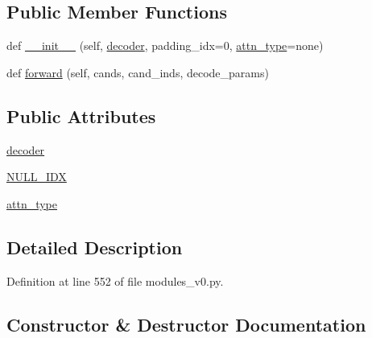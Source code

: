 \subsection*{Public Member Functions}
\begin{DoxyCompactItemize}
\item 
def \hyperlink{classparlai_1_1agents_1_1legacy__agents_1_1seq2seq_1_1modules__v0_1_1Ranker_a79693c86fc7bebea2b197e1c168ec002}{\+\_\+\+\_\+init\+\_\+\+\_\+} (self, \hyperlink{classparlai_1_1agents_1_1legacy__agents_1_1seq2seq_1_1modules__v0_1_1Ranker_a5500f3bd094b3a3b19c992cbc1d42918}{decoder}, padding\+\_\+idx=0, \hyperlink{classparlai_1_1agents_1_1legacy__agents_1_1seq2seq_1_1modules__v0_1_1Ranker_a17f285352bdb89eea215c874a38bee02}{attn\+\_\+type}=\textquotesingle{}none\textquotesingle{})
\item 
def \hyperlink{classparlai_1_1agents_1_1legacy__agents_1_1seq2seq_1_1modules__v0_1_1Ranker_a48177b131d765ebd734d25f962c44f55}{forward} (self, cands, cand\+\_\+inds, decode\+\_\+params)
\end{DoxyCompactItemize}
\subsection*{Public Attributes}
\begin{DoxyCompactItemize}
\item 
\hyperlink{classparlai_1_1agents_1_1legacy__agents_1_1seq2seq_1_1modules__v0_1_1Ranker_a5500f3bd094b3a3b19c992cbc1d42918}{decoder}
\item 
\hyperlink{classparlai_1_1agents_1_1legacy__agents_1_1seq2seq_1_1modules__v0_1_1Ranker_a17d8139e8d7e9952f0f17e8884710744}{N\+U\+L\+L\+\_\+\+I\+DX}
\item 
\hyperlink{classparlai_1_1agents_1_1legacy__agents_1_1seq2seq_1_1modules__v0_1_1Ranker_a17f285352bdb89eea215c874a38bee02}{attn\+\_\+type}
\end{DoxyCompactItemize}


\subsection{Detailed Description}


Definition at line 552 of file modules\+\_\+v0.\+py.



\subsection{Constructor \& Destructor Documentation}
\mbox{\label{classparlai_1_1agents_1_1legacy__agents_1_1seq2seq_1_1modules__v0_1_1Ranker_a79693c86fc7bebea2b197e1c168ec002}} 
